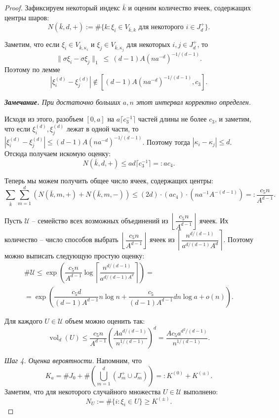\documentclass[12pt]{article}
\theoremstyle{plain}
\theoremstyle{definition}
\theoremstyle{remark}
\def\geq{\geqslant}
\def\leq{\leqslant}
\DeclareMathOperator{\vol}{vol}
\begin{document}
\begin{proof}
Зафиксируем некоторый индекс $\bar k$ и оценим количество ячеек, содержащих центры шаров: $$N(\bar k, d, +):= \#\{k\colon \xi_i\in V_{\bar k, k} \text{ для некоторого } i\in J_d^+\}.$$

Заметим, что если $\xi_i\in V_{\bar k, \kappa_i}$ и $\xi_j\in V_{\bar k, \kappa_j}$ для некоторых $i, j\in J_d^+$, то $$\|\sigma\xi_i - \sigma\xi_j\|_1~\leq~(d-1)A(na^{-d})^{-1/(d-1)}.$$ 
Поэтому по лемме $$|\xi_i^{(d)} - \xi_j^{(d)}| \not\in [(d-1)A(na^{-d})^{-1/(d-1)}, c_3].$$

{\it {\bf Замечание.} При достаточно больших $a, n$ этот интервал корректно определен.}

Исходя из этого, разобъем $[0,a]$ на $a\lceil c_3^{-1}\rceil$ частей длины не более $c_3$, и заметим, что если $\xi_i^{(d)}, \xi_j^{(d)}$ лежат в одной части, то $|\xi_i^{(d)} - \xi_j^{(d)}| \leq (d-1)A(na^{-d})^{-1/(d-1)}$. Поэтому тогда $|\kappa_i - \kappa_j|\leq d$. Отсюда получаем искомую оценку: $$N(\bar k, d, +)\leq ad \lceil c_3^{-1}\rceil =: ac_4.$$

Теперь мы можем получить общее число ячеек, содержащих центры: $$\sum_{\bar k}\sum_{m=1}^d (N(\bar k, m, +) + N(\bar k, m, -))\leq (2d)\cdot(ac_4)\cdot (na^{-1}A^{-(d-1)}) =: \dfrac{c_5 n}{A^{d-1}}.$$

Пусть $\mathcal{U}$ -- семейство всех возможных объединений из $\left\lfloor \dfrac{c_5 n}{A^{d-1}}\right\rfloor$ ячеек. Их количество -- число способов выбрать $\left\lfloor \dfrac{c_5 n}{A^{d-1}}\right\rfloor$ ячеек из $\left\lceil \dfrac{n^{d/(d-1)}}{a^{d/(d-1)}A^d}\right\rceil$. Поэтому можно выписать следующую простую оценку: \begin{multline*}
    \#\mathcal{U}\leq \exp \left(\dfrac{c_5 n}{A^{d-1}} \log \left\lceil \dfrac{n^{d/(d-1)}}{a^{d/(d-1)A^d}}\right\rceil \right) = \\
    =\exp \left(\dfrac{c_5d}{(d-1)A^{d-1}}n\log n + \dfrac{c_5}{(d-1)A^{d-1}}dn\log a + o(n)\right).
\end{multline*}{}

Для каждого $U\in \mathcal{U}$ объем можно оценить так: $$\vol_d (U)\leq \dfrac{c_5n}{A^{d-1}}\left(\dfrac{Aa^{d/(d-1)}}{n^{1/(d-1)}}\right)^d = \dfrac{Ac_5a^{d^2/(d-1)}}{n^{1/(d-1)}}.$$

{\it Шаг 4. Оценка вероятности.} Напомним, что $$K_a = \#J_0 + \#\left(\bigcup_{m=1}^d (J_m^+ \cup J_m^-)\right) =: K^{(0)} + K^{(\pm)}.$$
Заметим, что для некоторого случайного множества $U\in\mathcal{U}$ выполнено: $$N_U := \#\{i\colon \xi_i\in U\} \geq K^{(\pm)}.$$


\end{proof}
\end{document}
